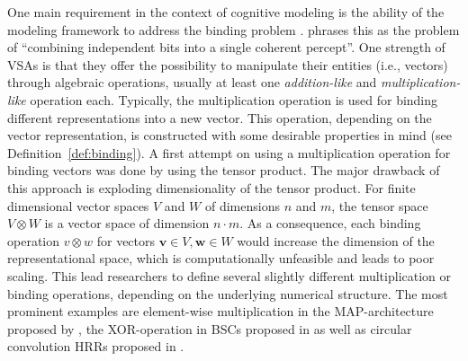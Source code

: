 One main requirement in the context of cognitive modeling is the ability of the modeling framework to address the binding problem \parencite{Treisman1999}.
\textcite{Jackendoff2002} phrases this as the problem of \enquote{combining independent bits into a single coherent percept}.
One strength of \acp{VSA} is that they offer the possibility to manipulate their entities (i.e., vectors) through algebraic operations, usually at least one \emph{addition-like} and \emph{multiplication-like} operation each.
Typically, the multiplication operation is used for binding different representations into a new vector.
This operation, depending on the vector representation, is constructed with some desirable properties in mind (see Definition~\ref{def:binding}).
A first attempt on using a multiplication operation for binding vectors was done by \textcite{Smolensky1990} using the tensor product.
The major drawback of this approach is exploding dimensionality of the tensor product.
For finite dimensional vector spaces  $V$ and $W$ of dimensions $n$ and $m$, the tensor space $V \otimes W$ is a vector space of dimension $n\cdot m$.
As a consequence, each binding operation $v\otimes w$ for vectors $ \mathbf{v} \in V, \mathbf{w} \in W$ would increase the dimension of the representational space, which is computationally unfeasible and leads to poor scaling.
This lead researchers to define several slightly different multiplication or binding operations, depending on the underlying numerical structure.
The most prominent examples are element-wise multiplication in the \ac{MAP}-architecture proposed by \textcite{Gayler1998}, the XOR-operation in \acp{BSC} proposed in \textcite{Kanerva2000, Kanerva2009} as well as circular convolution \acp{HRR} proposed in \textcite{Plate1991, Plate1994}.

